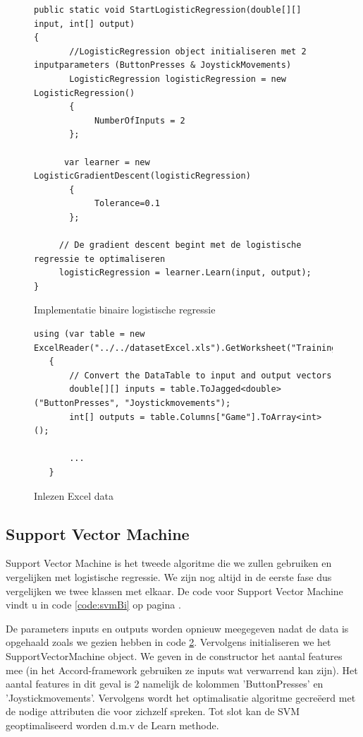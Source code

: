 \begin{figure}[]
	\renewcommand{\figurename}{Code}
\begin{lstlisting}
public static void StartLogisticRegression(double[][] input, int[] output)
{
       //LogisticRegression object initialiseren met 2 inputparameters (ButtonPresses & JoystickMovements)
       LogisticRegression logisticRegression = new LogisticRegression()
       {
       		NumberOfInputs = 2
       };
       
      var learner = new LogisticGradientDescent(logisticRegression)
       {
            Tolerance=0.1
       };
    
     // De gradient descent begint met de logistische regressie te optimaliseren
     logisticRegression = learner.Learn(input, output);
}

\end{lstlisting}
\caption{Implementatie binaire logistische regressie}
\label{code:linaireRegressieTweeKlassen}
\end{figure}
\begin{figure}[]
	\renewcommand{\figurename}{Code}
	\begin{lstlisting}
using (var table = new ExcelReader("../../datasetExcel.xls").GetWorksheet("Training"))
   {
       // Convert the DataTable to input and output vectors
       double[][] inputs = table.ToJagged<double>("ButtonPresses", "Joystickmovements");
       int[] outputs = table.Columns["Game"].ToArray<int>();
       
       ...
   }
	\end{lstlisting}
	\caption{Inlezen Excel data}
	\label{code:dataInlezen}
\end{figure}

\newpage
\subsection{Support Vector Machine}
\label{sec:supportvectormachine}
Support Vector Machine is het tweede algoritme die we zullen gebruiken en vergelijken met logistische regressie. 
We zijn nog altijd in de eerste fase dus vergelijken we twee klassen met elkaar. 
De code voor Support Vector Machine vindt u in code \ref{code:svmBi} op pagina \pageref{code:svmBi}. 

De parameters inputs en outputs worden opnieuw meegegeven nadat de data is opgehaald zoals we gezien hebben in code \ref{code:dataInlezen}. Vervolgens initialiseren we het SupportVectorMachine object. We geven in de constructor het aantal features mee (in het Accord-framework gebruiken ze inputs wat verwarrend kan zijn). Het aantal features in dit geval is 2 namelijk de kolommen 'ButtonPresses' en 'Joystickmovements'. Vervolgens wordt het optimalisatie algoritme gecreëerd met de nodige attributen die voor zichzelf spreken. Tot slot kan de SVM geoptimaliseerd worden d.m.v de Learn methode.  

